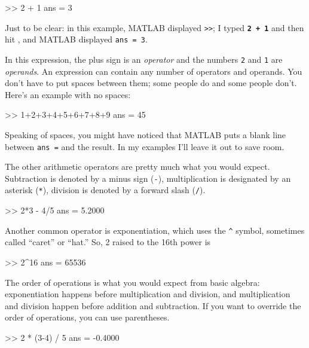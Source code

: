 \documentclass[../../book.tex]{subfiles}
\begin{document}
\begin{code}
>> 2 + 1
ans = 3
\end{code}

Just to be clear: in this example, MATLAB displayed \lstinline{>>}; I
typed \textbf{\lstinline{2 + 1}} and then hit , and MATLAB displayed \lstinline{ans = 3}.


In this expression, the plus sign is an \emph{operator} and the numbers \lstinline{2} and \lstinline{1} are \emph{operands}.
An expression can contain any number of operators and operands.  You
don't have to put spaces between them; some people do and some people
don't. Here's an example with no spaces:

\begin{code}
>> 1+2+3+4+5+6+7+8+9
ans = 45
\end{code}

Speaking of spaces, you might have noticed that MATLAB puts a blank
line between \lstinline{ans =} and the result.  In my examples I'll leave it out to  save room.


The other arithmetic operators are pretty much what you would expect.
Subtraction is denoted by a minus sign (\lstinline{-}), multiplication is designated by
an asterisk (\lstinline{*}), division is denoted by a forward slash (\lstinline{/}).

\begin{code}
>> 2*3 - 4/5
ans = 5.2000
\end{code}

Another common operator is exponentiation, which uses the \lstinline{^}
symbol, sometimes called ``caret'' or ``hat.''  So, 2 raised to the
16th power is

\begin{code}
>> 2^16
ans = 65536
\end{code}

The order of operations is what you would expect from basic algebra:
exponentiation happens before multiplication and division, and multiplication and division happen before addition and subtraction.
If you want to override the order of operations, you can use parentheses.


\begin{code}
>> 2 * (3-4) / 5
ans = -0.4000
\end{code}
\end{document}
